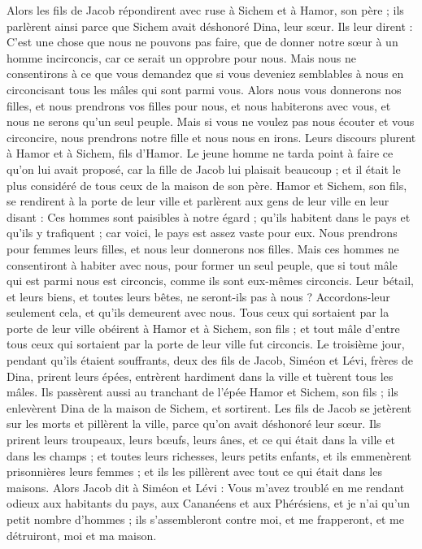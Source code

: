 \begin{multicols}{2}
Alors les fils de Jacob répondirent avec ruse à Sichem et à Hamor, son père ; ils parlèrent ainsi parce que Sichem avait déshonoré Dina, leur sœur.
Ils leur dirent : C’est une chose que nous ne pouvons pas faire, que de donner notre sœur à un homme incirconcis, car ce serait un opprobre pour nous.
Mais nous ne consentirons à ce que vous demandez que si vous deveniez semblables à nous en circoncisant tous les mâles qui sont parmi vous.
Alors nous vous donnerons nos filles, et nous prendrons vos filles pour nous, et nous habiterons avec vous, et nous ne serons qu'un seul peuple.
Mais si vous ne voulez pas nous écouter et vous circoncire, nous prendrons notre fille et nous nous en irons.
Leurs discours plurent à Hamor et à Sichem, fils d'Hamor.
Le jeune homme ne tarda point à faire ce qu'on lui avait proposé, car la fille de Jacob lui plaisait beaucoup ; et il était le plus considéré de tous ceux de la maison de son père.
Hamor et Sichem, son fils, se rendirent à la porte de leur ville et parlèrent aux gens de leur ville en leur disant :
Ces hommes sont paisibles à notre égard ; qu'ils habitent dans le pays et qu'ils y trafiquent ; car voici, le pays est assez vaste pour eux. Nous prendrons pour femmes leurs filles, et nous leur donnerons nos filles.
Mais ces hommes ne consentiront à habiter avec nous, pour former un seul peuple, que si tout mâle qui est parmi nous est circoncis, comme ils sont eux-mêmes circoncis.
Leur bétail, et leurs biens, et toutes leurs bêtes, ne seront-ils pas à nous ? Accordons-leur seulement cela, et qu'ils demeurent avec nous.
Tous ceux qui sortaient par la porte de leur ville obéirent à Hamor et à Sichem, son fils ; et tout mâle d'entre tous ceux qui sortaient par la porte de leur ville fut circoncis.
Le troisième jour, pendant qu’ils étaient souffrants, deux des fils de Jacob, Siméon et Lévi, frères de Dina, prirent leurs épées, entrèrent hardiment dans la ville et tuèrent tous les mâles.
Ils passèrent aussi au tranchant de l'épée Hamor et Sichem, son fils ; ils enlevèrent Dina de la maison de Sichem, et sortirent.
Les fils de Jacob se jetèrent sur les morts et pillèrent la ville, parce qu'on avait déshonoré leur sœur.
Ils prirent leurs troupeaux, leurs bœufs, leurs ânes, et ce qui était dans la ville et dans les champs ;
et toutes leurs richesses, leurs petits enfants, et ils emmenèrent prisonnières leurs femmes ; et ils les pillèrent avec tout ce qui était dans les maisons.
Alors Jacob dit à Siméon et Lévi : Vous m'avez troublé en me rendant odieux aux habitants du pays, aux Cananéens et aux Phérésiens, et je n'ai qu’un petit nombre d’hommes ; ils s'assembleront contre moi, et me frapperont, et me détruiront, moi et ma maison.

\end{multicols}
